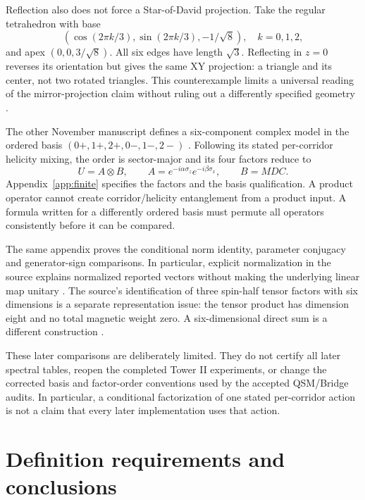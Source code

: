 \documentclass[11pt,a4paper]{article}
\theoremstyle{definition}
\numberwithin{equation}{section}
\begin{document}
Reflection also does not force a Star-of-David projection. Take the
regular tetrahedron with base
\[
 (\cos(2\pi k/3),\sin(2\pi k/3),-1/\sqrt8),\quad k=0,1,2,
\]
and apex $(0,0,3/\sqrt8)$. All six edges have length $\sqrt3$.
Reflecting in $z=0$ reverses its orientation but gives the same XY
projection: a triangle and its center, not two rotated triangles.
This counterexample limits a universal reading of the mirror-projection
claim without ruling out a differently specified geometry
\cite[physical pp.~10--11]{P14}.

The other November manuscript defines a six-component complex model in
the ordered basis $(0+,1+,2+,0-,1-,2-)$
\cite[physical pp.~3--6]{P15}. Following its stated per-corridor
helicity mixing, the order is sector-major and its four factors reduce to
\begin{equation}
 U=A\otimes B,\qquad
 A=e^{-i\alpha\sigma_z}e^{-i\beta\sigma_x},\qquad B=MDC.
 \label{eq:finite-factorization}
\end{equation}
Appendix~\ref{app:finite} specifies the factors and the basis qualification.
A product operator cannot create corridor/helicity entanglement from a
product input. A formula written for a differently ordered basis must
permute all operators consistently before it can be compared.

The same appendix proves the conditional norm identity, parameter
conjugacy and generator-sign comparisons. In particular, explicit
normalization in the source explains normalized reported vectors without
making the underlying linear map unitary
\cite[physical pp.~24,44--45]{P15}.
The source's identification of three spin-half tensor factors with six
dimensions is a separate representation issue: the tensor product has
dimension eight and no total magnetic weight zero. A six-dimensional
direct sum is a different construction
\cite[physical p.~49, Appendix O]{P15}.

These later comparisons are deliberately limited. They do not certify all
later spectral tables, reopen the completed Tower II experiments, or change
the corrected basis and factor-order conventions used by the accepted
QSM/Bridge audits. In particular, a conditional factorization of one
stated per-corridor action is not a claim that every later implementation
uses that action.

\section{Definition requirements and conclusions}
\label{sec:conclusion}
\end{document}
